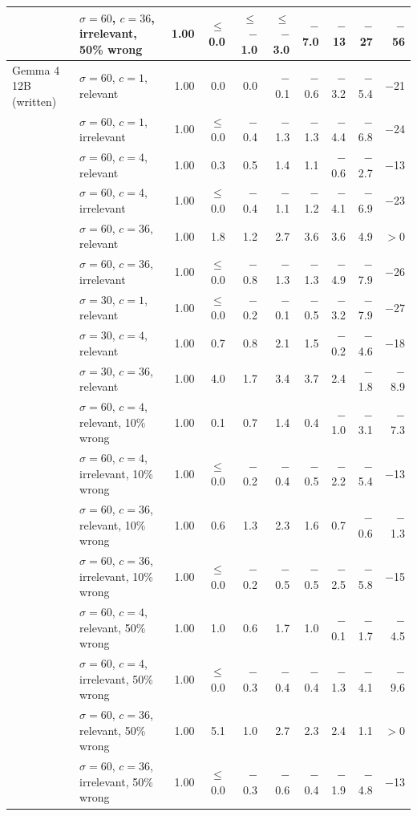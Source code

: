 \begin{tabular}{llrrrrrrrr}
 & $\sigma = 60$, $c = 36$, irrelevant, 50\% wrong & 1.00 & $\leq$ 0.0 & $\leq$ $-$1.0 & $\leq$ $-$3.0 & $-$7.0 & $-$13 & $-$27 & $-$56 \\
\midrule
Gemma 4 12B (written) & $\sigma = 60$, $c = 1$, relevant & 1.00 & 0.0 & 0.0 & $-$0.1 & $-$0.6 & $-$3.2 & $-$5.4 & $-$21 \\
 & $\sigma = 60$, $c = 1$, irrelevant & 1.00 & $\leq$ 0.0 & $-$0.4 & $-$1.3 & $-$1.3 & $-$4.4 & $-$6.8 & $-$24 \\
 & $\sigma = 60$, $c = 4$, relevant & 1.00 & 0.3 & 0.5 & 1.4 & 1.1 & $-$0.6 & $-$2.7 & $-$13 \\
 & $\sigma = 60$, $c = 4$, irrelevant & 1.00 & $\leq$ 0.0 & $-$0.4 & $-$1.1 & $-$1.2 & $-$4.1 & $-$6.9 & $-$23 \\
 & $\sigma = 60$, $c = 36$, relevant & 1.00 & 1.8 & 1.2 & 2.7 & 3.6 & 3.6 & 4.9 & $> 0$ \\
 & $\sigma = 60$, $c = 36$, irrelevant & 1.00 & $\leq$ 0.0 & $-$0.8 & $-$1.3 & $-$1.3 & $-$4.9 & $-$7.9 & $-$26 \\
 & $\sigma = 30$, $c = 1$, relevant & 1.00 & $\leq$ 0.0 & $-$0.2 & $-$0.1 & $-$0.5 & $-$3.2 & $-$7.9 & $-$27 \\
 & $\sigma = 30$, $c = 4$, relevant & 1.00 & 0.7 & 0.8 & 2.1 & 1.5 & $-$0.2 & $-$4.6 & $-$18 \\
 & $\sigma = 30$, $c = 36$, relevant & 1.00 & 4.0 & 1.7 & 3.4 & 3.7 & 2.4 & $-$1.8 & $-$8.9 \\
 & $\sigma = 60$, $c = 4$, relevant, 10\% wrong & 1.00 & 0.1 & 0.7 & 1.4 & 0.4 & $-$1.0 & $-$3.1 & $-$7.3 \\
 & $\sigma = 60$, $c = 4$, irrelevant, 10\% wrong & 1.00 & $\leq$ 0.0 & $-$0.2 & $-$0.4 & $-$0.5 & $-$2.2 & $-$5.4 & $-$13 \\
 & $\sigma = 60$, $c = 36$, relevant, 10\% wrong & 1.00 & 0.6 & 1.3 & 2.3 & 1.6 & 0.7 & $-$0.6 & $-$1.3 \\
 & $\sigma = 60$, $c = 36$, irrelevant, 10\% wrong & 1.00 & $\leq$ 0.0 & $-$0.2 & $-$0.5 & $-$0.5 & $-$2.5 & $-$5.8 & $-$15 \\
 & $\sigma = 60$, $c = 4$, relevant, 50\% wrong & 1.00 & 1.0 & 0.6 & 1.7 & 1.0 & $-$0.1 & $-$1.7 & $-$4.5 \\
 & $\sigma = 60$, $c = 4$, irrelevant, 50\% wrong & 1.00 & $\leq$ 0.0 & $-$0.3 & $-$0.4 & $-$0.4 & $-$1.3 & $-$4.1 & $-$9.6 \\
 & $\sigma = 60$, $c = 36$, relevant, 50\% wrong & 1.00 & 5.1 & 1.0 & 2.7 & 2.3 & 2.4 & 1.1 & $> 0$ \\
 & $\sigma = 60$, $c = 36$, irrelevant, 50\% wrong & 1.00 & $\leq$ 0.0 & $-$0.3 & $-$0.6 & $-$0.4 & $-$1.9 & $-$4.8 & $-$13 \\

\end{tabular}
